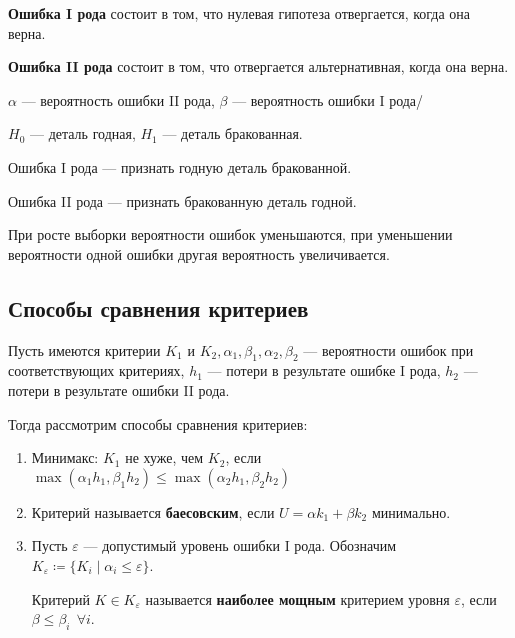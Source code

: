 \begin{definition}
    \textbf{Ошибка I рода} состоит в том, что нулевая гипотеза отвергается, когда она верна.
\end{definition}

\begin{definition}
    \textbf{Ошибка II рода} состоит в том, что отвергается альтернативная, когда она верна.
\end{definition}

\begin{definition}
    \(\alpha\) --- вероятность ошибки II рода, \(\beta\) --- вероятность ошибки I рода/
\end{definition}

\begin{example}
    \(H_0\) --- деталь годная, \(H_1\) --- деталь бракованная.

    Ошибка I рода --- признать годную деталь бракованной.

    Ошибка II рода --- признать бракованную деталь годной.
\end{example}

\begin{remark}
    При росте выборки вероятности ошибок уменьшаются, при уменьшении вероятности одной ошибки другая вероятность увеличивается.
\end{remark}

\subsection{Способы сравнения критериев}

Пусть имеются критерии \(K_1\) и \(K_2, \alpha_1, \beta_1, \alpha_2, \beta_2\) --- вероятности ошибок при соответствующих критериях, \(h_1\) --- потери в результате ошибке I рода, \(h_2\) --- потери в результате ошибки II рода.

Тогда рассмотрим способы сравнения критериев:
\begin{enumerate}
    \item Минимакс: \(K_1\) не хуже, чем \(K_2\), если \(\max(\alpha_1 h_1, \beta_1 h_2) \leq \max(\alpha_2 h_1, \beta_2 h_2)\)
    \item Критерий называется \textbf{баесовским}, если \(U = \alpha k_1 + \beta k_2\) минимально.
    \item Пусть \(\varepsilon\) --- допустимый уровень ошибки I рода. Обозначим \(K_\varepsilon \coloneqq \{K_i \mid \alpha_i \leq \varepsilon\}\).

          \begin{definition}
              Критерий \(K \in K_\varepsilon\) называется \textbf{наиболее мощным} критерием уровня \(\varepsilon\), если \(\beta \leq \beta_i \ \ \forall i\).
          \end{definition}
\end{enumerate}

